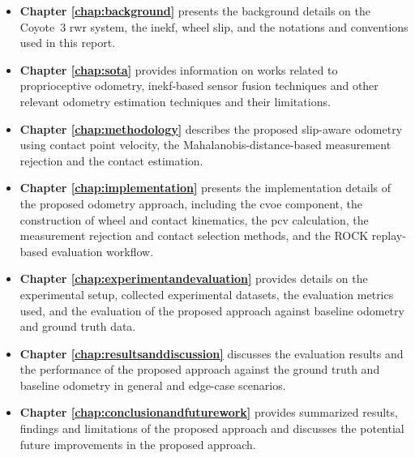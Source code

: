 \documentclass[report.tex]{subfiles}
\begin{document}
    \begin{itemize}
        \item[] \textbf{Chapter \ref{chap:background}} presents the background details on the Coyote~3 \gls{rwr} system, the \gls{inekf}, wheel slip, and the notations and conventions used in this report.
        \item[] \textbf{Chapter \ref{chap:sota}} provides information on works related to proprioceptive odometry, \gls{inekf}-based sensor fusion techniques and other relevant odometry estimation techniques and their limitations.
        \item[] \textbf{Chapter \ref{chap:methodology}} describes the proposed slip-aware odometry using contact point velocity, the Mahalanobis-distance-based measurement rejection and the contact estimation.
        \item[] \textbf{Chapter \ref{chap:implementation}} presents the implementation details of the proposed odometry approach, including the \gls{cvoe} component, the construction of wheel and contact kinematics, the \gls{pcv} calculation, the measurement rejection and contact selection methods, and the ROCK replay-based evaluation workflow.
        \item[] \textbf{Chapter \ref{chap:experimentandevaluation}} provides details on the experimental setup, collected experimental datasets, the evaluation metrics used, and the evaluation of the proposed approach against baseline odometry and ground truth data.
        \item[] \textbf{Chapter \ref{chap:resultsanddiscussion}} discusses the evaluation results and the performance of the proposed approach against the ground truth and baseline odometry in general and edge-case scenarios.
        \item[] \textbf{Chapter \ref{chap:conclusionandfuturework}} provides summarized results, findings and limitations of the proposed approach and discusses the potential future improvements in the proposed approach.
    
    \end{itemize}
\end{document}
